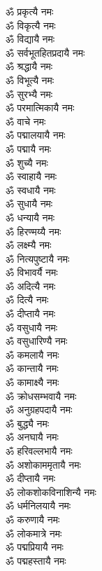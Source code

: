 \begin{multicols}{2}
\begin{flushleft}
ॐ प्रकृत्यै नमः\\
ॐ विकृत्यै नमः\\
ॐ विद्यायै नमः\\
ॐ सर्वभूतहितप्रदायै नमः\\
ॐ श्रद्धायै नमः\\
ॐ विभूत्यै नमः\\
ॐ सुरभ्यै नमः\\
ॐ परमात्मिकायै नमः\\
ॐ वाचे नमः\\
ॐ पद्मालयायै नमः\hfill{}\\
ॐ पद्मायै नमः\\
ॐ शुच्यै नमः\\
ॐ स्वाहायै नमः\\
ॐ स्वधायै नमः\\
ॐ सुधायै नमः\\
ॐ धन्यायै नमः\\
ॐ हिरण्मय्यै नमः\\
ॐ लक्ष्म्यै नमः\\
ॐ नित्यपुष्टायै नमः\\
ॐ विभावर्यै नमः\hfill{}\\
ॐ अदित्यै नमः\\
ॐ दित्यै नमः\\
ॐ दीप्तायै नमः\\
ॐ वसुधायै नमः\\
ॐ वसुधारिण्यै नमः\\
ॐ कमलायै नमः\\
ॐ कान्तायै नमः\\
ॐ कामाक्ष्यै नमः\\
ॐ क्रोधसम्भवायै नमः\\
ॐ अनुग्रहपदायै नमः\hfill{}\\
ॐ बुद्ध्यै नमः\\
ॐ अनघायै नमः\\
ॐ हरिवल्लभायै नमः\\
ॐ अशोकाममृतायै नमः\\
ॐ दीप्तायै नमः\\
ॐ लोकशोकविनाशिन्यै नमः\\
ॐ धर्मनिलयायै नमः\\
ॐ करुणायै नमः\\
ॐ लोकमात्रे नमः\\
ॐ पद्मप्रियायै नमः\hfill{}\\
ॐ पद्महस्तायै नमः\\

\end{flushleft}
\end{multicols}
